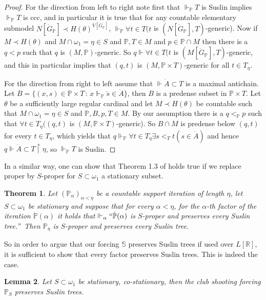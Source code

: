 \documentclass[a4paper,11pt]{article}
\newtheorem{theorem}{Theorem}[section]
\newtheorem{lemma}[theorem]{Lemma}
\newcommand{\forceP}{\mathbb{P}}
\newcommand{\forceR}{\mathbb{R}}
\begin{document}
\begin{proof}
For the direction from left to right note first that $\Vdash_{\forceP} T$ is Suslin implies $\Vdash_{\forceP} T$ is ccc, and in particular it is true that for any countable elementary submodel $N[\dot{G}_{\forceP}] \prec H(\theta)^{V[\dot{G}_{\forceP}]}$,  $\Vdash_{\forceP} \forall t \in T (t$ is $(N[\dot{G}_{\forceP}],T)$-generic). Now if $M \prec H(\theta)$ and $M \cap \omega_1 = \eta \in S$ and $\forceP,T \in M$ and $p \in \forceP \cap M$ then there is a $q<p$ such that $q$ is $(M,\forceP)$-generic. So $q \Vdash \forall t \in T (t$ is $(M[\dot{G}_{\forceP}], T)$-generic, and this in particular implies that $(q,t)$ is $(M, \forceP \times T)$-generic for all $t \in T_{\eta}$. 

For the direction from right to left assume that $\Vdash \dot{A} \subset T$ is a maximal antichain. Let $B=\{(x,s) \in \forceP \times T \, : \, x \Vdash_{\forceP} \check{s} \in \dot{A} \}$, then $B$ is a predense subset in $\forceP \times T$. Let $\theta$ be a sufficiently large regular cardinal and let $M \prec H(\theta)$ be countable such that $M \cap \omega_1=\eta \in S$ and $\forceP, B,p,T \in M$. By our assumption there is a $q <_{\forceP} p$  such that $\forall t \in T_{\eta} ((q,t)$ is $(M, \forceP \times T)$-generic). So $B \cap M$ is predense below $(q,t)$ for every $t \in T_{\eta}$, which yields that $q \Vdash_{\forceP} \forall t \in T_{\eta} \exists s<_{T} t(s \in \dot{A})$ and hence $q \Vdash \dot{A} \subset T \upharpoonright \eta$, so $\Vdash_{\forceP} T$ is Suslin.
\end{proof}
In a similar way, one can show that Theorem 1.3 of \cite{Miyamoto2} holds true if we replace proper by $S$-proper for $S \subset \omega_1$ a stationary subset.
\begin{theorem}
Let $(\forceP_{\alpha})_{\alpha < \eta}$ be a countable support iteration of length $\eta$, let $S \subset \omega_1$ be stationary and suppose that for every $\alpha < \eta$, for the $\alpha$-th factor of the iteration $\dot{\forceP}(\alpha)$ it holds that $\Vdash_{\alpha}  ``\dot{\forceP}(\alpha)$ is $S$-proper and 
preserves every Suslin tree.$"$ Then $\forceP_{\eta}$ is $S$-proper and preserves every Suslin tree.
\end{theorem}
So in order to argue that our forcing $\mathbb{S}$ preserves Suslin trees if used over $L[\forceR]$, it is sufficient to show that every factor preserves Suslin trees.
This is indeed the case.
\begin{lemma}
Let $S \subset \omega_1$ be stationary, co-stationary, then the club shooting forcing $\forceP_S$ preserves Suslin trees.
\end{lemma}
\end{document}
